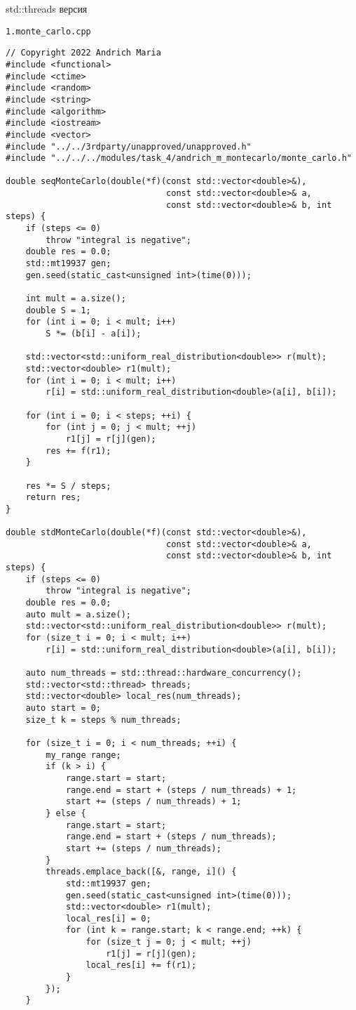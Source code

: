 \documentclass{report}
\begin{document}
\par std::threads версия
\par \verb|1.monte_carlo.cpp|
\begin{lstlisting}
// Copyright 2022 Andrich Maria
#include <functional>
#include <ctime>
#include <random>
#include <string>
#include <algorithm>
#include <iostream>
#include <vector>
#include "../../3rdparty/unapproved/unapproved.h"
#include "../../../modules/task_4/andrich_m_montecarlo/monte_carlo.h"

double seqMonteCarlo(double(*f)(const std::vector<double>&),
                                const std::vector<double>& a,
                                const std::vector<double>& b, int steps) {
    if (steps <= 0)
        throw "integral is negative";
    double res = 0.0;
    std::mt19937 gen;
    gen.seed(static_cast<unsigned int>(time(0)));

    int mult = a.size();
    double S = 1;
    for (int i = 0; i < mult; i++)
        S *= (b[i] - a[i]);

    std::vector<std::uniform_real_distribution<double>> r(mult);
    std::vector<double> r1(mult);
    for (int i = 0; i < mult; i++)
        r[i] = std::uniform_real_distribution<double>(a[i], b[i]);

    for (int i = 0; i < steps; ++i) {
        for (int j = 0; j < mult; ++j)
            r1[j] = r[j](gen);
        res += f(r1);
    }

    res *= S / steps;
    return res;
}

double stdMonteCarlo(double(*f)(const std::vector<double>&),
                                const std::vector<double>& a,
                                const std::vector<double>& b, int steps) {
    if (steps <= 0)
        throw "integral is negative";
    double res = 0.0;
    auto mult = a.size();
    std::vector<std::uniform_real_distribution<double>> r(mult);
    for (size_t i = 0; i < mult; i++)
        r[i] = std::uniform_real_distribution<double>(a[i], b[i]);

    auto num_threads = std::thread::hardware_concurrency();
    std::vector<std::thread> threads;
    std::vector<double> local_res(num_threads);
    auto start = 0;
    size_t k = steps % num_threads;

    for (size_t i = 0; i < num_threads; ++i) {
        my_range range;
        if (k > i) {
            range.start = start;
            range.end = start + (steps / num_threads) + 1;
            start += (steps / num_threads) + 1;
        } else {
            range.start = start;
            range.end = start + (steps / num_threads);
            start += (steps / num_threads);
        }
        threads.emplace_back([&, range, i]() {
            std::mt19937 gen;
            gen.seed(static_cast<unsigned int>(time(0)));
            std::vector<double> r1(mult);
            local_res[i] = 0;
            for (int k = range.start; k < range.end; ++k) {
                for (size_t j = 0; j < mult; ++j)
                    r1[j] = r[j](gen);
                local_res[i] += f(r1);
            }
        });
    }


\end{lstlisting}
\end{document}

